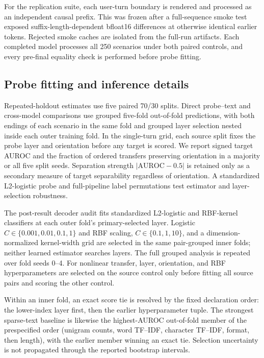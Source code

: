 \documentclass{article}
\begin{document}
For the replication suite, each user-turn boundary is rendered and processed
as an independent causal prefix. This was frozen after a full-sequence smoke
test exposed suffix-length-dependent bfloat16 differences at otherwise
identical earlier tokens. Rejected smoke caches are isolated from the full-run
artifacts. Each completed model processes all 250 scenarios under both paired
controls, and every pre-final equality check is performed before probe fitting.

\subsection{Probe fitting and inference details}
\label{app:fitting-details}

Repeated-holdout estimates use five paired 70/30 splits. Direct probe--text and
cross-model comparisons use grouped five-fold out-of-fold predictions, with
both endings of each scenario in the same fold and grouped layer selection
nested inside each outer training fold. In the single-turn grid, each source
split fixes the probe layer and orientation before any target is scored. We
report signed target AUROC and the fraction of ordered transfers preserving
orientation in a majority or all five split seeds. Separation strength
$|\mathrm{AUROC}-0.5|$ is retained only as a secondary measure of target
separability regardless of orientation. A
standardized L2-logistic probe and full-pipeline label permutations test
estimator and layer-selection robustness.

The post-result decoder audit fits standardized L2-logistic and RBF-kernel
classifiers at each outer fold's primary-selected layer. Logistic
$C\in\{0.001,0.01,0.1,1\}$ and RBF scaling, $C\in\{0.1,1,10\}$, and a
dimension-normalized kernel-width grid are selected in the same pair-grouped
inner folds; neither learned estimator searches layers. The full grouped
analysis is repeated over fold seeds 0--4. For nonlinear transfer, layer,
orientation, and RBF hyperparameters are selected on the source control only
before fitting all source pairs and scoring the other control.

Within an inner fold, an exact score tie is resolved by the fixed declaration
order: the lower-index layer first, then the earlier hyperparameter tuple. The
strongest sparse-text baseline is likewise the highest-AUROC out-of-fold member
of the prespecified order (unigram counts, word TF--IDF, character TF--IDF,
format, then length), with the earlier member winning an exact tie. Selection
uncertainty is not propagated through the reported bootstrap intervals.
\end{document}
